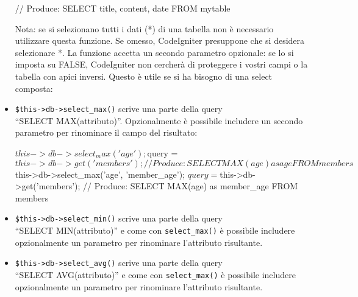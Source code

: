 \begin{itemize}
\begin{code}
// Produce: SELECT title, content, date FROM mytable
\end{code}

Nota: se si selezionano tutti i dati (*) di una tabella non è necessario utilizzare questa funzione. Se omesso, CodeIgniter presuppone che si desidera selezionare *.
La funzione accetta un secondo parametro opzionale: se lo si imposta su FALSE, CodeIgniter non cercherà di proteggere i vostri campi o la tabella con apici inversi. Questo è utile se si ha bisogno di una select composta:


\item \verb|$this->db->select_max()| scrive una parte della query \\ ``SELECT MAX(attributo)''. Opzionalmente è possibile includere un secondo parametro per rinominare il campo del risultato:

\begin{code}
$this->db->select_max('age');
$query = $this->db->get('members');
// Produce: SELECT MAX(age) as age FROM members

$this->db->select_max('age', 'member_age');
$query = $this->db->get('members');
// Produce: SELECT MAX(age) as member_age FROM members
\end{code}

\item \verb|$this->db->select_min()| 
scrive una parte della query \\ ``SELECT MIN(attributo)'' e come con \verb|select_max()| è possibile includere opzionalmente un parametro per rinominare l'attributo risultante.


\item \verb|$this->db->select_avg()| scrive una parte della query \\ ``SELECT AVG(attributo)'' e come con \verb|select_max()| è possibile includere opzionalmente un parametro per rinominare l'attributo risultante.



\end{itemize}
